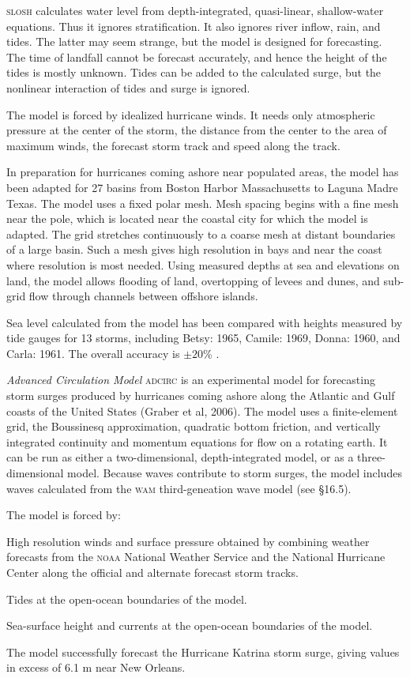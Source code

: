 \textsc{slosh} calculates water level from depth-integrated,
quasi-linear, shallow-water equations. Thus it ignores
stratification. It also ignores river inflow, rain, and tides. The
latter may seem strange, but the model is designed for
forecasting. The time of landfall cannot be forecast accurately, and
hence the height of the tides is mostly unknown. Tides
can be added to the calculated surge,
but the nonlinear interaction of tides and surge is ignored.

The model is forced by idealized hurricane winds. It needs only
atmospheric pressure at the center of the storm, the distance from the
center to the area of maximum winds, the forecast storm track and
speed along the track.

In preparation for hurricanes coming ashore near populated areas, the
model has been adapted for 27 basins from Boston Harbor Massachusetts
to Laguna Madre Texas. The model uses a fixed polar mesh. Mesh spacing
begins with a fine mesh near the pole, which is located near the
coastal city for which the model is adapted. The grid stretches
continuously to a coarse mesh at distant boundaries of a large
basin. Such a mesh gives high resolution in bays and near the coast
where resolution is most needed. Using measured depths at sea and
elevations on land, the model allows flooding of land, overtopping of
levees and dunes, and sub-grid flow through channels between offshore
islands.

Sea level calculated from the model has been compared with heights
measured by tide gauges for 13 storms, including Betsy: 1965, Camile:
1969, Donna: 1960, and Carla: 1961. The overall
accuracy is $\pm 20$\% .

\textit{Advanced Circulation Model} \textsc{adcirc} is an
experimental model for forecasting storm surges produced by hurricanes
coming ashore along the Atlantic and Gulf coasts of the United States
(Graber et al, 2006). The model uses a finite-element grid, the
Boussinesq approximation, quadratic bottom friction, and vertically
integrated continuity and momentum equations for flow on a rotating
earth. It can be run as either a two-dimensional, depth-integrated
model, or as a three-dimensional model. Because waves contribute to
storm surges, the model includes waves calculated from the
\textsc{wam} third-geneation wave model (see \S 16.5).

The model is forced by:
\begin{enumerate}
\vitem High resolution winds and surface pressure obtained by
combining weather forecasts from the \textsc{noaa} National Weather
Service and the National Hurricane Center along the official and
alternate forecast storm tracks.

\vitem Tides at the open-ocean boundaries of the model.

\vitem Sea-surface height and currents at the open-ocean boundaries of
the model.
\end{enumerate}
The model successfully forecast the Hurricane Katrina storm surge,
giving values in excess of 6.1 m near New Orleans.

